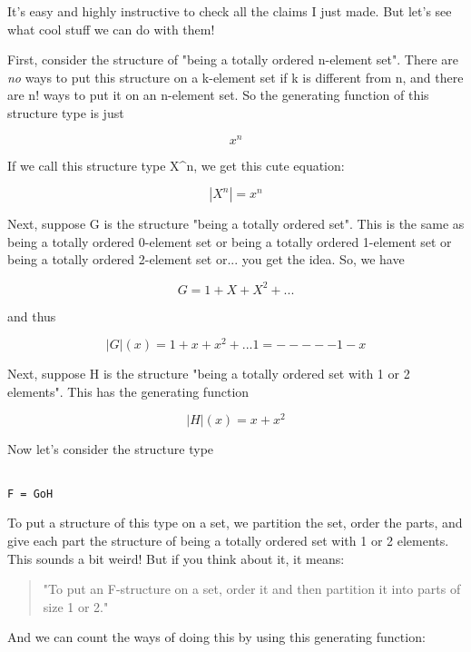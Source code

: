 It's easy and highly instructive to check all the claims I just made. 
But let's see what cool stuff we can do with them!   

First, consider the structure of "being a totally ordered n-element
set".  There are \emph{no} 
ways to put this structure on a k-element set if
k is different from n, and there are n! ways to put it on an n-element 
set.  So the generating function of this structure type is just


$$

x^{n}
$$
    
If we call this structure type X^{n}, we get this cute equation:


$$

|X^{n}| = x^{n}
$$
    
Next, suppose G is the structure "being a totally ordered set".  This 
is the same as being a totally ordered 0-element set or being a totally
ordered 1-element set or being a totally ordered 2-element set or... 
you get the idea.  So, we have


$$

     G = 1 + X + X^{2} + ...
$$
    
and thus


$$

|G|(x) = 1 + x + x^{2} + ...
 
           1
       = -----
         1 - x
$$
    
Next, suppose H is the structure "being a totally ordered set with 1 
or 2 elements".  This has the generating function


$$

|H|(x) = x + x^{2}
$$
    
Now let's consider the structure type


\begin{verbatim}

F = GoH
\end{verbatim}
    
To put a structure of this type on a set, we partition the set, order the
parts, and give each part the structure of being a totally ordered set
with 1 or 2 elements.  This sounds a bit weird!  But if you think about
it, it means:

\begin{quote}
      "To put an F-structure on a set, order it and then partition
       it into parts of size 1 or 2."
\end{quote}
And we can count the ways of doing this by using this generating function:


